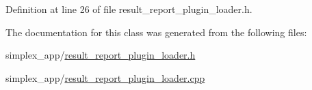 Definition at line 26 of file result\+\_\+report\+\_\+plugin\+\_\+loader.\+h.



The documentation for this class was generated from the following files\+:\begin{DoxyCompactItemize}
\item 
simplex\+\_\+app/\hyperlink{result__report__plugin__loader_8h}{result\+\_\+report\+\_\+plugin\+\_\+loader.\+h}\item 
simplex\+\_\+app/\hyperlink{result__report__plugin__loader_8cpp}{result\+\_\+report\+\_\+plugin\+\_\+loader.\+cpp}\end{DoxyCompactItemize}
